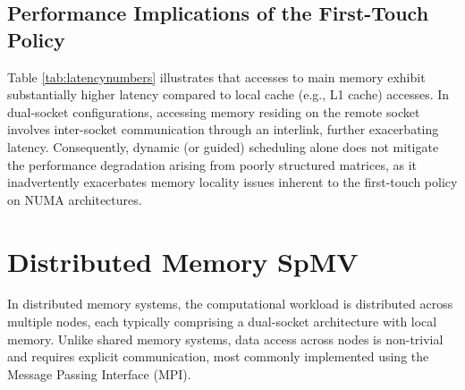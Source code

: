 \subsection{Performance Implications of the First-Touch Policy}

Table \ref{tab:latencynumbers} illustrates that accesses to main memory exhibit substantially higher latency compared to local cache (e.g., L1 cache) accesses. In dual-socket configurations, accessing memory residing on the remote socket involves inter-socket communication through an interlink, further exacerbating latency. Consequently, dynamic (or guided) scheduling alone does not mitigate the performance degradation arising from poorly structured matrices, as it inadvertently exacerbates memory locality issues inherent to the first-touch policy on NUMA architectures.












\section{Distributed Memory SpMV}

In distributed memory systems, the computational workload is distributed across multiple nodes, each typically comprising a dual-socket architecture with local memory. Unlike shared memory systems, data access across nodes is non-trivial and requires explicit communication, most commonly implemented using the Message Passing Interface (MPI).

